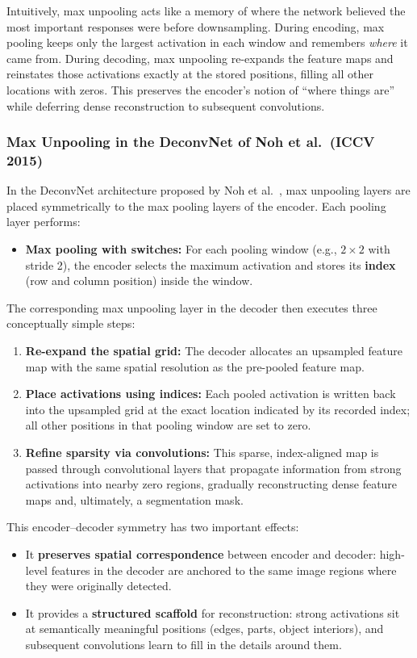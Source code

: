 \noindent
Intuitively, max unpooling acts like a memory of where the network believed the most important responses were before downsampling. During encoding, max pooling keeps only the largest activation in each window and remembers \emph{where} it came from. During decoding, max unpooling re-expands the feature maps and reinstates those activations exactly at the stored positions, filling all other locations with zeros. This preserves the encoder’s notion of ``where things are'' while deferring dense reconstruction to subsequent convolutions.

\subsubsection{Max Unpooling in the DeconvNet of Noh et al.\ (ICCV 2015)}

\noindent
In the DeconvNet architecture proposed by Noh et al.\ \cite{noh2015_deconvnet}, max unpooling layers are placed symmetrically to the max pooling layers of the encoder. Each pooling layer performs:
\begin{itemize}
	\item \textbf{Max pooling with switches:} For each pooling window (e.g., \(2 \times 2\) with stride 2), the encoder selects the maximum activation and stores its \textbf{index} (row and column position) inside the window.
\end{itemize}

\noindent
The corresponding max unpooling layer in the decoder then executes three conceptually simple steps:
\begin{enumerate}
	\item \textbf{Re-expand the spatial grid:} The decoder allocates an upsampled feature map with the same spatial resolution as the pre-pooled feature map.
	\item \textbf{Place activations using indices:} Each pooled activation is written back into the upsampled grid at the exact location indicated by its recorded index; all other positions in that pooling window are set to zero.
	\item \textbf{Refine sparsity via convolutions:} This sparse, index-aligned map is passed through convolutional layers that propagate information from strong activations into nearby zero regions, gradually reconstructing dense feature maps and, ultimately, a segmentation mask.
\end{enumerate}

\noindent
This encoder–decoder symmetry has two important effects:
\begin{itemize}
	\item It \textbf{preserves spatial correspondence} between encoder and decoder: high-level features in the decoder are anchored to the same image regions where they were originally detected.
	\item It provides a \textbf{structured scaffold} for reconstruction: strong activations sit at semantically meaningful positions (edges, parts, object interiors), and subsequent convolutions learn to fill in the details around them.
\end{itemize}

